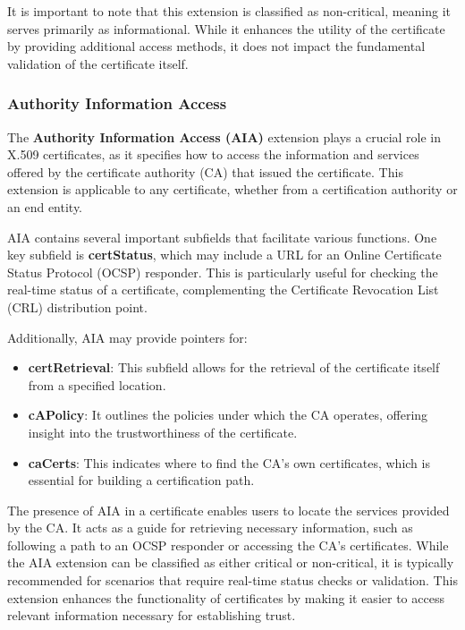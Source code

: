 It is important to note that this extension is classified as 
non-critical, meaning it serves primarily as informational. 
While it enhances the utility of the certificate by providing 
additional access methods, it does not impact the fundamental 
validation of the certificate itself.
\subsubsection{Authority Information Access}

The \textbf{Authority Information Access (AIA)} extension plays a 
crucial role in X.509 certificates, as it specifies how to access 
the information and services offered by the certificate authority 
(CA) that issued the certificate. This extension is applicable 
to any certificate, whether from a certification authority or an 
end entity.

AIA contains several important subfields that facilitate various 
functions. One key subfield is \textbf{certStatus}, which may include 
a URL for an Online Certificate Status Protocol (OCSP) responder. 
This is particularly useful for checking the real-time status of a 
certificate, complementing the Certificate Revocation List (CRL) 
distribution point. 

Additionally, AIA may provide pointers for:

\begin{itemize}
  \item \textbf{certRetrieval}: This subfield allows for the retrieval 
    of the certificate itself from a specified location.
  \item \textbf{cAPolicy}: It outlines the policies under which the CA 
    operates, offering insight into the trustworthiness of the 
    certificate.
  \item \textbf{caCerts}: This indicates where to find the CA's own 
    certificates, which is essential for building a certification 
    path.
\end{itemize}

The presence of AIA in a certificate enables users to locate 
the services provided by the CA. It acts as a guide for 
retrieving necessary information, such as following a path to 
an OCSP responder or accessing the CA's certificates. While the 
AIA extension can be classified as either critical or non-critical, 
it is typically recommended for scenarios that require real-time 
status checks or validation. This extension enhances the 
functionality of certificates by making it easier to access 
relevant information necessary for establishing trust.

